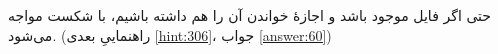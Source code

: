 \section{}
\paragraph{}\label{hint:288}
حتی اگر فایل موجود باشد و اجازهٔ خواندن آن را هم داشته باشیم،  با شکست مواجه می‌شود. (راهنماییِ بعدی \ref{hint:306}، جواب \ref{answer:60})